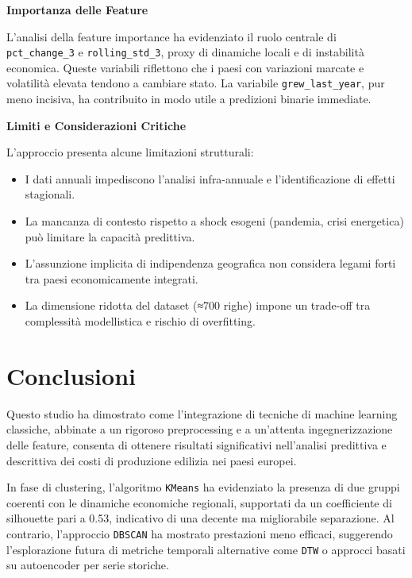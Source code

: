 \documentclass[conference]{IEEEtran}
\begin{document}
\vspace{1em}\noindent\textbf{Importanza delle Feature}

L’analisi della feature importance ha evidenziato il ruolo centrale di \texttt{pct\_change\_3} e \texttt{rolling\_std\_3}, proxy di dinamiche locali e di instabilità economica. Queste variabili riflettono che i paesi con variazioni marcate e volatilità elevata tendono a cambiare stato. La variabile \texttt{grew\_last\_year}, pur meno incisiva, ha contribuito in modo utile a predizioni binarie immediate.

\vspace{1em}\noindent\textbf{Limiti e Considerazioni Critiche}

L’approccio presenta alcune limitazioni strutturali: \begin{itemize} \item I dati annuali impediscono l’analisi infra-annuale e l’identificazione di effetti stagionali. \item La mancanza di contesto rispetto a shock esogeni (pandemia, crisi energetica) può limitare la capacità predittiva. \item L’assunzione implicita di indipendenza geografica non considera legami forti tra paesi economicamente integrati. \item La dimensione ridotta del dataset (≈700 righe) impone un trade-off tra complessità modellistica e rischio di overfitting. \end{itemize}

\section*{\LARGE \textbf{Conclusioni}}

Questo studio ha dimostrato come l'integrazione di tecniche di machine learning classiche, abbinate a un rigoroso preprocessing e a un’attenta ingegnerizzazione delle feature, consenta di ottenere risultati significativi nell’analisi predittiva e descrittiva dei costi di produzione edilizia nei paesi europei.

In fase di clustering, l’algoritmo \texttt{KMeans} ha evidenziato la presenza di due gruppi coerenti con le dinamiche economiche regionali, supportati da un coefficiente di silhouette pari a 0.53, indicativo di una decente ma migliorabile separazione. Al contrario, l’approccio \texttt{DBSCAN} ha mostrato prestazioni meno efficaci, suggerendo l’esplorazione futura di metriche temporali alternative come \texttt{DTW} o approcci basati su autoencoder per serie storiche.
\end{document}
